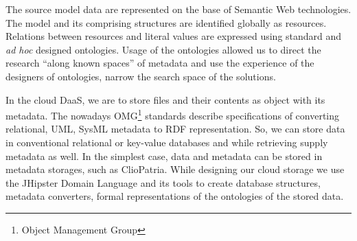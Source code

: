 \documentclass[a4paper]{jpconf}
\begin{document}
The source model data are represented on the base of Semantic Web technologies.  The model and its comprising structures are identified globally as resources.  Relations between resources and literal values are expressed using standard and \emph{ad hoc} designed ontologies.  Usage of the ontologies allowed us to direct the research ``along known spaces'' of metadata and use the experience of the designers of ontologies, narrow the search space of the solutions.


In the cloud DaaS, we are to store files and their contents as object with its metadata.  The nowadays OMG\footnote{Object Management Group} standards describe specifications of converting relational, UML, SysML metadata to RDF representation.  So, we can store data in conventional relational or key-value databases and while retrieving supply metadata as well.  In the simplest case, data and metadata can be stored in metadata storages, such as ClioPatria.  While designing our cloud storage we use the JHipster Domain Language \cite{jhipster} and its tools to create database structures, metadata converters, formal representations of the ontologies of the stored data.

\end{document}
